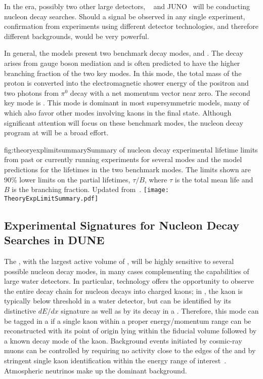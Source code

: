 In the  era, possibly two other large detectors, \hyperk~\cite{Abe:2018uyc} and JUNO~\cite{Djurcic:2015vqa} will be conducting nucleon decay searches. Should a signal be observed in any single experiment, confirmation from experiments using different detector technologies, and therefore different backgrounds, would be very powerful.

In general, the  models present two benchmark decay modes, \ptoepizero and \ptoknubar.  The decay \ptoepizero arises from gauge boson mediation and is often predicted to have the higher branching fraction of the two key modes. In this mode, the total mass of the proton is converted into the electromagnetic shower energy of the positron and two photons from $\pi^0$ decay with a net momentum vector near zero. 
The second key mode is \ptoknubar. This mode is dominant in most supersymmetric  models,
many of which also favor other modes involving kaons in the final state.
Although significant attention will focus on these benchmark modes, the nucleon decay program at  will be a broad effort.

\begin{dunefigure}{fig:theoryexplimitsummary}{Summary of nucleon decay experimental lifetime limits from past or currently running experiments for several modes and the model predictions for the lifetimes in the two benchmark modes.  The limits shown are 90\%  lower limits on the partial lifetimes, $\tau/B$, where $\tau$ is the total mean life and $B$ is the branching fraction. Updated from~\cite{Babu:2013jba}.}
\texttt{[image: TheoryExpLimitSummary.pdf]}
\end{dunefigure}


\subsection{Experimental Signatures for Nucleon Decay Searches in DUNE}
\label{subsec:nonaccel-ndk-dune}

The  , with the largest active volume of , 
will be highly sensitive to several possible nucleon decay modes, 
in many cases complementing the capabilities of large water detectors.
In particular,  technology offers the opportunity to observe the entire decay chain for nucleon decays into charged kaons; in \ptoknubar, the kaon is typically below \cherenkov threshold in a water \cherenkov detector, but can be identified by its distinctive $dE/dx$ signature as well as by its decay in a .
Therefore, this mode can be tagged in a  if a single kaon within a proper energy/momentum range can be reconstructed with its point of origin lying within the fiducial volume followed by a known decay mode of the kaon.
Background events initiated by cosmic-ray muons can be controlled  by requiring no activity close to the edges of the  and by stringent single kaon identification within the energy range of interest~\cite{bib:docdb3384,bib:docdb1752}.  Atmospheric neutrinos make up the dominant background.

